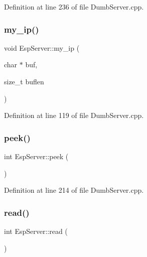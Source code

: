 Definition at line 236 of file Dumb\+Server.\+cpp.

\mbox{\label{class_esp_server_a55995fd6398892be5768da85dde4f533}} 
\subsubsection{\texorpdfstring{my\+\_\+ip()}{my\_ip()}}
{\footnotesize\ttfamily void Esp\+Server\+::my\+\_\+ip (\begin{DoxyParamCaption}\item[{char $\ast$}]{buf,  }\item[{size\+\_\+t}]{buflen }\end{DoxyParamCaption})}



Definition at line 119 of file Dumb\+Server.\+cpp.

\mbox{\label{class_esp_server_a005a9cd487f4ccb4ccef72197bf263b7}} 
\subsubsection{\texorpdfstring{peek()}{peek()}}
{\footnotesize\ttfamily int Esp\+Server\+::peek (\begin{DoxyParamCaption}{ }\end{DoxyParamCaption})\hspace{0.3cm}{\ttfamily [virtual]}}



Definition at line 214 of file Dumb\+Server.\+cpp.

\mbox{\label{class_esp_server_ae47512714818b3b9a1d29d2bf1f70fdf}} 
\subsubsection{\texorpdfstring{read()}{read()}}
{\footnotesize\ttfamily int Esp\+Server\+::read (\begin{DoxyParamCaption}{ }\end{DoxyParamCaption})\hspace{0.3cm}{\ttfamily [virtual]}}



